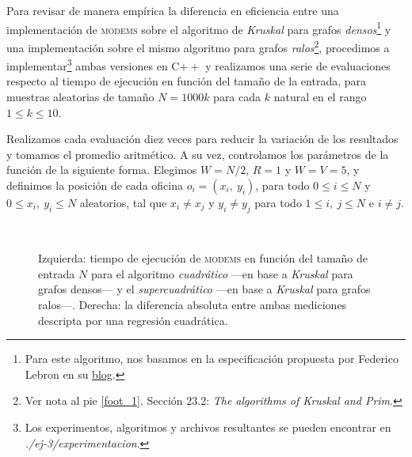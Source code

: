 

Para revisar de manera empírica la diferencia en eficiencia entre una implementación de \textsc{modems} sobre el algoritmo de \textit{Kruskal} para grafos \textit{densos}\footnote{Para este algoritmo, nos basamos en la especificación propuesta por Federico Lebron en su \href{https://fedelebron.com/a-dense-version-of-kruskals-algorithm}{\color{blue} blog}.} y una implementación sobre el mismo algoritmo para grafos \textit{ralos}\footnote{Ver nota al pie \ref{foot_1}. Sección 23.2: \textit{The algorithms of Kruskal and Prim}.}, procedimos a implementar\footnote{Los experimentos, algoritmos y archivos resultantes se pueden encontrar en \textit{./ej-3/experimentacion}.} ambas versiones en C$++$ y realizamos una serie de evaluaciones respecto al tiempo de ejecución en función del tamaño de la entrada, para muestras aleatorias de tamaño $N = 1000k$ para cada $k$ natural en el rango $1 \leq k \leq 10$. 

Realizamos cada evaluación diez veces para reducir la variación de los resultados y tomamos el promedio aritmético. 
A su vez, controlamos los parámetros de la función de la siguiente forma. Elegimos \mbox{$W = N/2$}, $R = 1$ y $W = V = 5$, y definimos la posición de cada oficina $o_i = (x_i,\ y_i)$, para todo $0 \leq i \leq N$ y $0 \leq x_i,\ y_i \leq N$ aleatorios, tal que $x_i \neq x_j$ y $y_i \neq y_j$ para todo $1 \leq i,\ j \leq N$ e $i \neq j$. 

\begin{figure}[!htbp]
    $\ \ \ \ $

    \caption{Izquierda: tiempo de ejecución de \textsc{modems} en función del tamaño de entrada $N$ para el algoritmo \textit{cuadrático} ---en base a \textit{Kruskal} para grafos densos--- y el \textit{supercuadrático} ---en base a \textit{Kruskal} para grafos ralos---. Derecha: la diferencia absoluta entre ambas mediciones descripta por una regresión cuadrática.}
    \label{grafico_1}
\end{figure}

